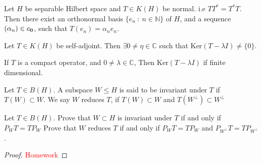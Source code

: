 \begin{theorem}
  Let $H$ be separable Hilbert space and $T\in K(H)$ be normal. i.e
  $TT^* = T^*T$. Then there exist an orthonormal basis $\{ e_n  \ :
  \  n \in \mathbb{N} \}$ of $H$, and a sequence $(\alpha_n) \in
  c_{\bf 0}$, such that $T(e_n) = \alpha_n e_n$.
\end{theorem}

\begin{lemma}
  Let $T \in K(H)$ be self-adjoint. Then $\exists 0 \neq \eta \in
  \mathbb{C}$ such that $ \textrm{Ker}(T - \lambda I) \neq \{ 0 \}$.
\end{lemma}

\begin{lemma}
  If $T$ is a compact operator, and $0 \neq \lambda \in \mathbb{C}$,
  Then $\textrm{Ker}(T - \lambda I)$ if finite dimensional.
\end{lemma}

\begin{definition}
  Let $T \in B(H)$. A subspace $W \leqslant H$ is said to be
  invariant under $T$ if $T(W) \subset W$. We say $W$ reduces $T$, if
  $T(W) \subset W$ and $T(W^\perp) \subset W^\perp$
\end{definition}

\begin{example}
  Let $T \in B(H)$.
  Prove that $W \subset H$ is invariant under $T$ if and only if $P_WT = TP_W$
  Prove that $W$ reduces $T$ if and only if $P_WT = TP_W$ and
  $P_{W^\perp}T = T P_{W^\perp}$.
\end{example}
\begin{proof}
  \textcolor{red}{Homework}
\end{proof}


